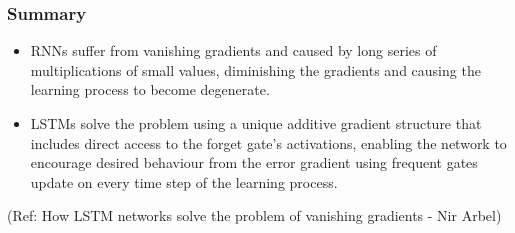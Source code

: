 \begin{frame}[fragile] \frametitle{Summary}
\begin{itemize}
\item RNNs suffer from vanishing gradients and caused by long series of multiplications of small values, diminishing the gradients and causing the learning process to become degenerate.
\item LSTMs solve the problem using a unique additive gradient structure that includes direct access to the forget gate’s activations, enabling the network to encourage desired behaviour from the error gradient using frequent gates update on every time step of the learning process.
\end{itemize}

{\tiny (Ref: How LSTM networks solve the problem of vanishing gradients
- Nir Arbel)}

\end{frame}

